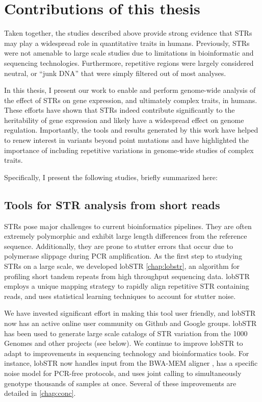 \section{Contributions of this thesis}
Taken together, the studies described above provide strong evidence that STRs may play a widespread role in quantitative traits in humans. Previously, STRs were not amenable to large scale studies due to limitations in bioinformatic and sequencing technologies. Furthermore, repetitive regions were largely considered neutral, or ``junk DNA'' that were simply filtered out of most analyses.

In this thesis, I present our work to enable and perform genome-wide analysis of the effect of STRs on gene expression, and ultimately complex traits, in humans. These efforts have shown that STRs indeed contribute significantly to the heritability of gene expression and likely have a widespread effect on genome regulation. Importantly, the tools and results generated by this work have helped to renew interest in variants beyond point mutations and have highlighted the importance of including repetitive variations in genome-wide studies of complex traits. 

Specifically, I present the following studies, briefly summarized here:

\subsection{Tools for STR analysis from short reads}
STRs pose major challenges to current bioinformatics pipelines. They are often extremely polymorphic and exhibit large length differences from the reference sequence. Additionally, they are prone to stutter errors that occur due to polymerase slippage during PCR amplification. As the first step to studying STRs on a large scale, we developed lobSTR \cite{GymrekGolanRossetEtAl2012} \autoref{chap:lobstr}, an algorithm for profiling short tandem repeats from high throughput sequencing data. lobSTR employs a unique mapping strategy to rapidly align repetitive STR containing reads, and uses statistical learning techniques to account for stutter noise.

We have invested significant effort in making this tool user friendly, and lobSTR now has an active online user community on Github and Google groups. lobSTR has been used to generate large scale catalogs of STR variation from the 1000 Genomes and other projects (see below). We continue to improve lobSTR to adapt to improvements in sequencing technology and bioinformatics tools. For instance, lobSTR now handles input from the BWA-MEM aligner \cite{2013arXiv1303.3997L}, has a specific noise model for PCR-free protocols, and uses joint calling to simultaneously genotype thousands of samples at once. Several of these improvements are detailed in \autoref{chap:conc}.


